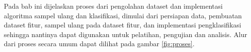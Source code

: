 Pada bab ini dijelaskan proses dari pengolahan dataset dan implementasi
algoritma sampel ulang dan klasifikasi, dimulai dari persiapan
data, pembuatan dataset fitur, sampel ulang pada dataset fitur, dan
implementasi pengklasifikasi sehingga nantinya dapat digunakan untuk pelatihan,
pengujian dan analisis.
Alur dari proses secara umum dapat dilihat pada gambar \ref{fig:proses}.
